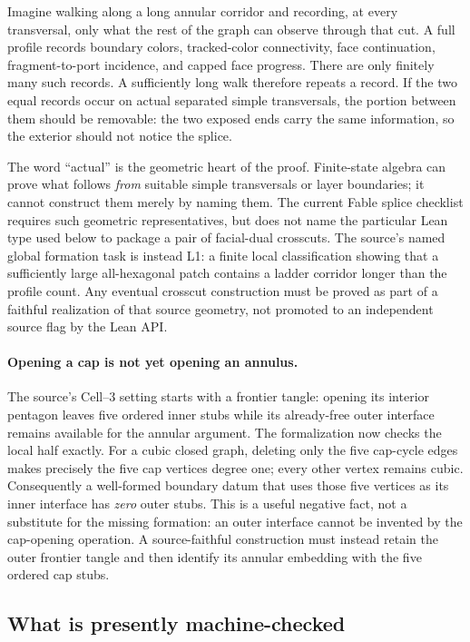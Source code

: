 \documentclass[11pt]{article}
\theoremstyle{definition}
\begin{document}
Imagine walking along a long annular corridor and recording, at every
transversal, only what the rest of the graph can observe through that cut.  A
full profile records boundary colors, tracked-color connectivity, face
continuation, fragment-to-port incidence, and capped face progress.  There are
only finitely many such records.  A sufficiently long walk therefore repeats a
record.  If the two equal records occur on actual separated simple
transversals, the portion between them should be removable: the two exposed
ends carry the same information, so the exterior should not notice the splice.

The word ``actual'' is the geometric heart of the proof.  Finite-state algebra
can prove what follows \emph{from} suitable simple transversals or layer
boundaries; it cannot construct them merely by naming them.  The current Fable
splice checklist requires such geometric representatives, but does not name
the particular Lean type used below to package a pair of facial-dual
crosscuts.  The source's named global formation task is instead L1: a finite
local classification showing that a sufficiently large all-hexagonal patch
contains a ladder corridor longer than the profile count.  Any eventual
crosscut construction must be proved as part of a faithful realization of that
source geometry, not promoted to an independent source flag by the Lean API.

\paragraph{Opening a cap is not yet opening an annulus.}
The source's Cell--3 setting starts with a frontier tangle: opening its
interior pentagon leaves five ordered inner stubs while its already-free outer
interface remains available for the annular argument.  The formalization now
checks the local half exactly.  For a cubic closed graph, deleting only the
five cap-cycle edges makes precisely the five cap vertices degree one; every
other vertex remains cubic.  Consequently a well-formed boundary datum that
uses those five vertices as its inner interface has \emph{zero} outer stubs.
This is a useful negative fact, not a substitute for the missing formation:
an outer interface cannot be invented by the cap-opening operation.  A
source-faithful construction must instead retain the outer frontier tangle and
then identify its annular embedding with the five ordered cap stubs.

\subsection{What is presently machine-checked}
\end{document}

